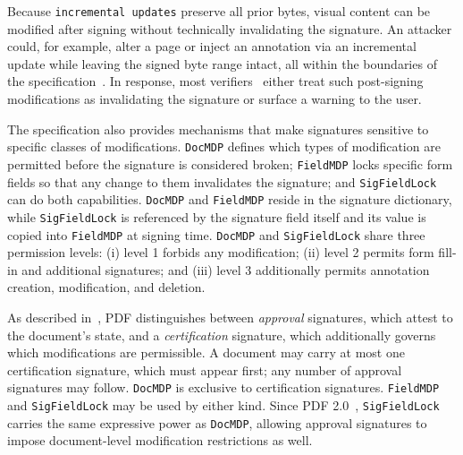 \documentclass[12pt]{article}
\begin{document}
Because \texttt{incremental updates} preserve all prior bytes, visual content can be modified after signing without technically invalidating the signature. An attacker could, for example, alter a page or inject an annotation via an incremental update while leaving the signed byte range intact, all within the boundaries of the specification~\cite{iso32000-2}. In response, most verifiers~\cite{adobereader,foxitreader,libreoffice} either treat such post-signing modifications as invalidating the signature or surface a warning to the user.

The specification also provides mechanisms that make signatures sensitive to specific classes of modifications. \texttt{DocMDP} defines which types of modification are permitted before the signature is considered broken; \texttt{FieldMDP} locks specific form fields so that any change to them invalidates the signature; and \texttt{SigFieldLock} can do both capabilities. \texttt{DocMDP} and \texttt{FieldMDP} reside in the signature dictionary, while \texttt{SigFieldLock} is referenced by the signature field itself and its value is copied into \texttt{FieldMDP} at signing time. \texttt{DocMDP} and \texttt{SigFieldLock} share three permission levels: (i) level 1 forbids any modification; (ii) level 2 permits form fill-in and additional signatures; and (iii) level 3 additionally permits annotation creation, modification, and deletion.

As described in~\cite{pdf-certification-attack}, PDF distinguishes between \emph{approval} signatures, which attest to the document's state, and a \emph{certification} signature, which additionally governs which modifications are permissible. A document may carry at most one certification signature, which must appear first; any number of approval signatures may follow. \texttt{DocMDP} is exclusive to certification signatures. \texttt{FieldMDP} and \texttt{SigFieldLock} may be used by either kind. Since PDF 2.0~\cite{iso32000-2}, \texttt{SigFieldLock} carries the same expressive power as \texttt{DocMDP}, allowing approval signatures to impose document-level modification restrictions as well. %

\end{document}
